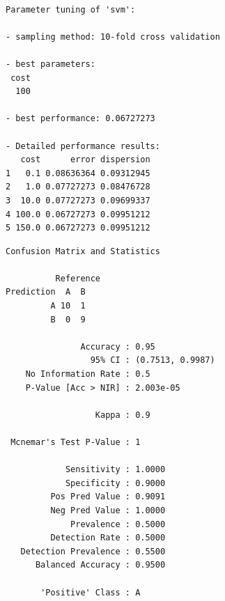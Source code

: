 \documentclass[
  a4paperpaper,
]{article}
\newenvironment{Shaded}{\begin{snugshade}}{\end{snugshade}}
\newcommand{\FunctionTok}[1]{\textcolor[rgb]{0.28,0.35,0.67}{#1}}
\newcommand{\NormalTok}[1]{\textcolor[rgb]{0.00,0.23,0.31}{#1}}
\newcommand{\OtherTok}[1]{\textcolor[rgb]{0.00,0.23,0.31}{#1}}
\newcommand{\SpecialCharTok}[1]{\textcolor[rgb]{0.37,0.37,0.37}{#1}}
\begin{document}
\begin{verbatim}

Parameter tuning of 'svm':

- sampling method: 10-fold cross validation 

- best parameters:
 cost
  100

- best performance: 0.06727273 

- Detailed performance results:
   cost      error dispersion
1   0.1 0.08636364 0.09312945
2   1.0 0.07727273 0.08476728
3  10.0 0.07727273 0.09699337
4 100.0 0.06727273 0.09951212
5 150.0 0.06727273 0.09951212
\end{verbatim}

\begin{Shaded}
\end{Shaded}

\begin{verbatim}
Confusion Matrix and Statistics

          Reference
Prediction  A  B
         A 10  1
         B  0  9
                                          
               Accuracy : 0.95            
                 95% CI : (0.7513, 0.9987)
    No Information Rate : 0.5             
    P-Value [Acc > NIR] : 2.003e-05       
                                          
                  Kappa : 0.9             
                                          
 Mcnemar's Test P-Value : 1               
                                          
            Sensitivity : 1.0000          
            Specificity : 0.9000          
         Pos Pred Value : 0.9091          
         Neg Pred Value : 1.0000          
             Prevalence : 0.5000          
         Detection Rate : 0.5000          
   Detection Prevalence : 0.5500          
      Balanced Accuracy : 0.9500          
                                          
       'Positive' Class : A               
                                          
\end{verbatim}
\end{document}

